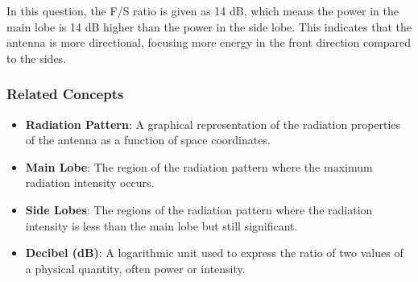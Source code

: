 In this question, the F/S ratio is given as 14 dB, which means the power in the main lobe is 14 dB higher than the power in the side lobe. This indicates that the antenna is more directional, focusing more energy in the front direction compared to the sides.

\subsubsection*{Related Concepts}
\begin{itemize}
    \item \textbf{Radiation Pattern}: A graphical representation of the radiation properties of the antenna as a function of space coordinates.
    \item \textbf{Main Lobe}: The region of the radiation pattern where the maximum radiation intensity occurs.
    \item \textbf{Side Lobes}: The regions of the radiation pattern where the radiation intensity is less than the main lobe but still significant.
    \item \textbf{Decibel (dB)}: A logarithmic unit used to express the ratio of two values of a physical quantity, often power or intensity.
\end{itemize}


